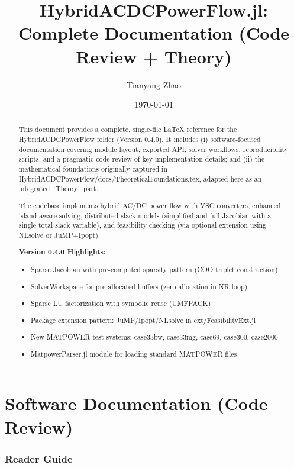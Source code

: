 \documentclass[11pt]{article}
\title{HybridACDCPowerFlow.jl:\\Complete Documentation (Code Review + Theory)}
\author{Tianyang Zhao}
\date{\today}
\def\code#1{#1}%
\def\file#1{#1}%
\newcommand{\code}[1]{\nolinkurl{#1}}
\newcommand{\file}[1]{\path{#1}}
\begin{document}
\maketitle

\begin{abstract}
This document provides a complete, single-file \LaTeX{} reference for the \code{HybridACDCPowerFlow} folder (Version 0.4.0). It includes (i) software-focused documentation covering module layout, exported API, solver workflows, reproducibility scripts, and a pragmatic code review of key implementation details; and (ii) the mathematical foundations originally captured in \file{HybridACDCPowerFlow/docs/TheoreticalFoundations.tex}, adapted here as an integrated ``Theory'' part.

The codebase implements hybrid AC/DC power flow with VSC converters, enhanced island-aware solving, distributed slack models (simplified and full Jacobian with a single total slack variable), and feasibility checking (via optional extension using NLsolve or JuMP+Ipopt).

\textbf{Version 0.4.0 Highlights:}
\begin{itemize}[leftmargin=*]
  \item Sparse Jacobian with pre-computed sparsity pattern (COO triplet construction)
  \item \code{SolverWorkspace} for pre-allocated buffers (zero allocation in NR loop)
  \item Sparse LU factorization with symbolic reuse (UMFPACK)
  \item Package extension pattern: JuMP/Ipopt/NLsolve in \code{ext/FeasibilityExt.jl}
  \item New MATPOWER test systems: case33bw, case33mg, case69, case300, case2000
  \item \code{MatpowerParser.jl} module for loading standard MATPOWER files
\end{itemize}
\end{abstract}

\tableofcontents
\newpage

\part{Software Documentation (Code Review)}

\section{Reader Guide}
\end{document}
